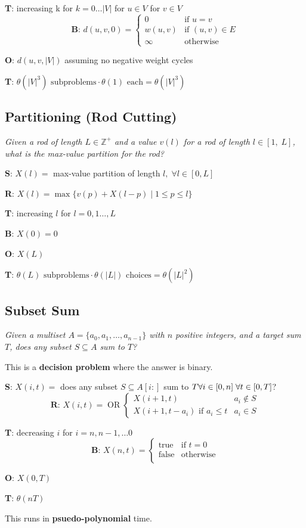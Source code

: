 \textbf{T}: increasing k for $k = 0 \dots |V|$ for $u \in V$ for $v \in V$\\[-0.2em]
\[ \textbf{B}\text{: } d(u, v, 0) = \begin{cases} 
    0 & \text{if } u = v \\
    w(u, v) & \text{if } (u, v) \in E \\
    \infty & \text{otherwise}
 \end{cases}
\]

\textbf{O}: $d(u, v, |V|)$ assuming no negative weight cycles

\textbf{T}: $\theta(|V|^3) \text{ subproblems} \cdot \theta(1) \text{ each} = \theta(|V|^3)$

\subsection{Partitioning (Rod Cutting)}
\emph{Given a rod of length $L \in \mathbb{Z}^+$ and a value $v(l)$ for a rod of length $l \in [1, \; L]$, what is the max-value partition for the rod?}

\textbf{S}: $X(l) = $ max-value partition of length $l, \; \forall l \in [0, L]$

\textbf{R}: $X(l) = \max \{ v(p) + X(l - p) \; | \; 1 \leq p \leq l\}$

\textbf{T}: increasing $l$ for $l = 0, 1 \dots, L$

\textbf{B}: $X(0) = 0$

\textbf{O}: $X(L)$

\textbf{T}: $\theta(L) \text{ subproblems} \cdot \theta(|L|) \text{ choices} = \theta(|L|^2)$

\subsection{Subset Sum}
\emph{Given a multiset $A = \{ a_0, a_1, \dots, a_{n-1} \}$ with $n$ positive integers, and a target sum $T$, does any subset $S \subseteq A$ sum to $T$?}

This is a \textbf{decision problem} where the answer is binary.

\textbf{S}: $X(i, t) = $ does any subset $S \subseteq A[i:]$ sum to $T \linebreak \forall i \in [0, n] \; \forall t \in [0, T]$?\\[-0.2em]
\[ \textbf{R}\text{: } X(i, t) = \operatorname{OR} \begin{cases} 
    X(i + 1, t) & a_i \notin S \\
    X(i + 1, t - a_i) \text{ if } a_i \leq t & a_i \in S
 \end{cases}
\]

\textbf{T}: decreasing $i$ for $i = n, n - 1, \dots 0$\\[-0.2em]
\[ \textbf{B}\text{: } X(n, t) = \begin{cases} 
    \text{true} & \text{if } t = 0 \\
    \text{false} & \text{otherwise} \\
 \end{cases}
\]

\textbf{O}: $X(0, T)$

\textbf{T}: $\theta(nT)$

This runs in \textbf{psuedo-polynomial} time.